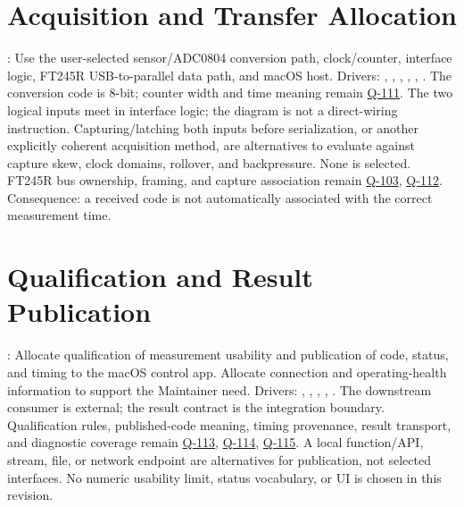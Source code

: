 \section{Acquisition and Transfer Allocation}
: Use the user-selected sensor/ADC0804 conversion path, clock/counter, interface logic, FT245R USB-to-parallel data path, and macOS host. Drivers: , , , , , . The conversion code is 8-bit; counter width and time meaning remain \hyperref[Question:Q-111]{Q-111}. The two logical inputs meet in interface logic; the diagram is not a direct-wiring instruction. Capturing/latching both inputs before serialization, or another explicitly coherent acquisition method, are alternatives to evaluate against capture skew, clock domains, rollover, and backpressure. None is selected. FT245R bus ownership, framing, and capture association remain \hyperref[Question:Q-103]{Q-103}, \hyperref[Question:Q-112]{Q-112}. Consequence: a received code is not automatically associated with the correct measurement time.

\section{Qualification and Result Publication}
: Allocate qualification of measurement usability and publication of code, status, and timing to the macOS control app. Allocate connection and operating-health information to support the Maintainer need. Drivers: , , , , . The downstream consumer is external; the result contract is the integration boundary. Qualification rules, published-code meaning, timing provenance, result transport, and diagnostic coverage remain \hyperref[Question:Q-113]{Q-113}, \hyperref[Question:Q-114]{Q-114}, \hyperref[Question:Q-115]{Q-115}. A local function/API, stream, file, or network endpoint are alternatives for publication, not selected interfaces. No numeric usability limit, status vocabulary, or UI is chosen in this revision.
